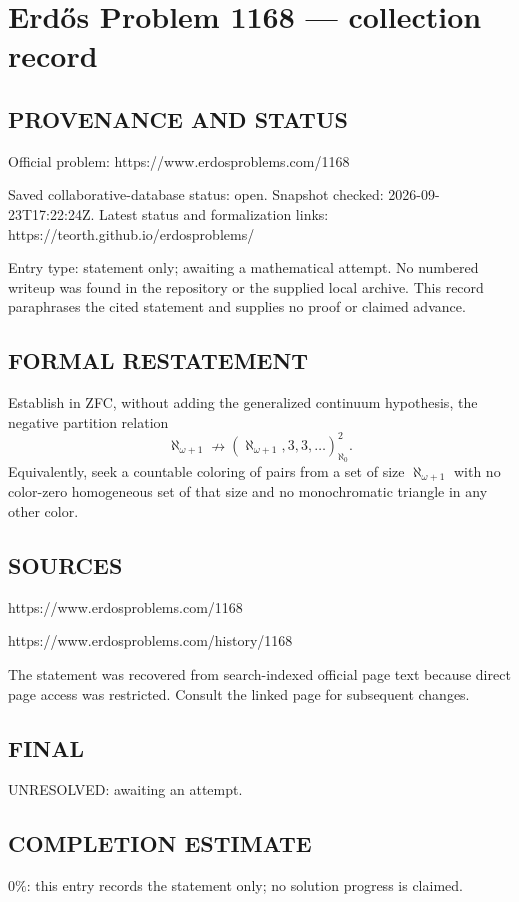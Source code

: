 \section*{Erd\H{o}s Problem 1168 --- collection record}

\subsection*{PROVENANCE AND STATUS}
Official problem: https://www.erdosproblems.com/1168

Saved collaborative-database status: open.
Snapshot checked: 2026-09-23T17:22:24Z.
Latest status and formalization links: https://teorth.github.io/erdosproblems/

Entry type: statement only; awaiting a mathematical attempt. No numbered writeup was found in the repository or the supplied local archive. This record paraphrases the cited statement and supplies no proof or claimed advance.

\subsection*{FORMAL RESTATEMENT}
Establish in ZFC, without adding the generalized continuum hypothesis, the negative partition relation
\[
\aleph_{\omega+1}\nrightarrow(\aleph_{\omega+1},3,3,\ldots)_{\aleph_0}^{2}.
\]
Equivalently, seek a countable coloring of pairs from a set of size $\aleph_{\omega+1}$ with no color-zero homogeneous set of that size and no monochromatic triangle in any other color.

\subsection*{SOURCES}
https://www.erdosproblems.com/1168

https://www.erdosproblems.com/history/1168

The statement was recovered from search-indexed official page text because direct page access was restricted. Consult the linked page for subsequent changes.

\subsection*{FINAL}
UNRESOLVED: awaiting an attempt.

\subsection*{COMPLETION ESTIMATE}
$0\%$: this entry records the statement only; no solution progress is claimed.

